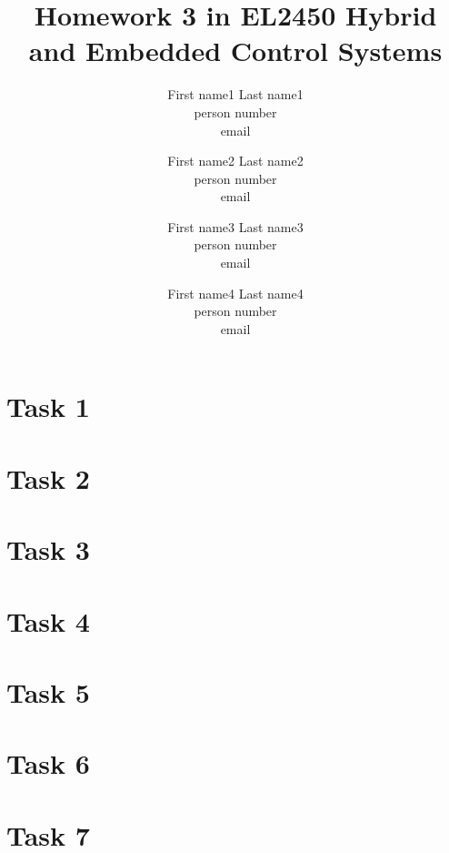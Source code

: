 \documentclass[a4paper,12pt,oneside,onecolumn]{article} %
\begin{document}

\title{Homework 3 in EL2450 Hybrid and Embedded Control Systems}
\author{
  First name1 Last name1 \\ person number \\ email
  \and
  First name2 Last name2 \\ person number \\ email
  \and
  First name3 Last name3 \\ person number \\ email
  \and
  First name4 Last name4 \\ person number \\ email
  \and
  }
\date{}

\maketitle                     %


\section*{Task 1}


\section*{Task 2}
%

\section*{Task 3}
%

\section*{Task 4}
%

\section*{Task 5}
%

\section*{Task 6}
%

\section*{Task 7}

\end{document}
